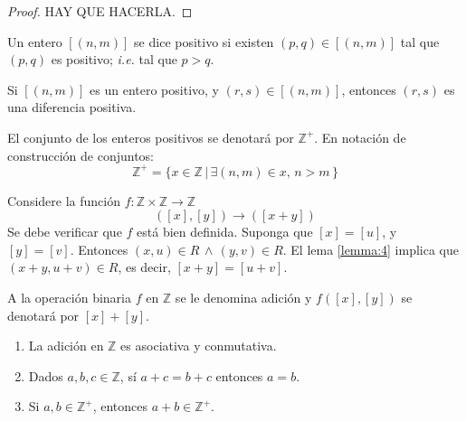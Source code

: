 \begin{proof}
  HAY QUE HACERLA.
\end{proof}
\begin{definition}
  Un entero $[(n,m)]$ se dice positivo si existen $(p,q)\in [(n,m)]$ tal que
  $(p,q)$ es positivo; \textit{i.e.} tal que $p>q$.
\end{definition}
\begin{remark}
  Si $[(n,m)]$ es un entero positivo, y $(r,s) \in [(n,m)]$, entonces $(r,s)$
  es una diferencia positiva.
\end{remark}
\begin{definition}
  El conjunto de los enteros positivos se denotará por $\mathbb{Z}^+$. En
  notación de construcción de conjuntos:
  \[
    \mathbb{Z}^+ = \{ x \in \mathbb{Z} \, | \, \exists (n,m) \in x,\, n >m
    \, \}
  \]
\end{definition}
Considere la función $f: \mathbb{Z} \times \mathbb{Z} \rightarrow \mathbb{Z}$ 
\[
  ([x], [y]) \rightarrow ([x + y])
\]
Se debe verificar que $f$ está bien definida.
Suponga que $[x] = [u]$, y  $[y] = [v]$. Entonces $(x,u) \in R \, \land \, (y,v)
\in R$. El lema \ref{lemma:4} implica que $(x + y, u + v) \in R$, es decir,
$[x+y] = [u+v]$.
\begin{definition}
  A la operación binaria $f$ en $\mathbb{Z}$ se le denomina adición y
  $f([x],[y])$ se denotará por $[x]+[y]$.
\end{definition}
\begin{proposition}\label{prop:28}
  \begin{enumerate}
    \item La adición en $\mathbb{Z}$ es asociativa y conmutativa.
    \item Dados $a,b,c \in \mathbb{Z}$, sí $a+c = b +c$ entonces $a = b$.
    \item Si $a, b \in \mathbb{Z^+}$, entonces $a + b \in \mathbb{Z^+}$.
  \end{enumerate}
\end{proposition}

